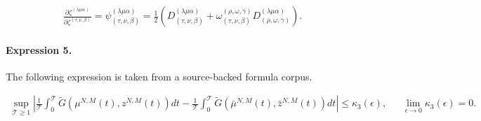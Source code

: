 \documentclass[11pt]{article}
\begin{document}
\begin{align*}\frac{\partial \zeta^{(\lambda\mu\alpha)}}{\partial \zeta^{(\tau,\nu,\beta)}}=\psi^{(\lambda\mu\alpha)}_{(\tau,\nu,\beta)}=\frac{1}{2} \left(D^{(\lambda\mu\alpha)}_{(\tau,\nu,\beta)}+\omega^{(\rho,\omega,\gamma)}_{(\tau,\nu,\beta)}D^{(\lambda\mu\alpha)}_{(\rho,\omega,\gamma)}\right).\end{align*}

\paragraph{Expression 5.} The following expression is taken from a source-backed formula corpus.

\begin{align*}\sup_{\mathcal{T} \geq 1}|\frac{1}{\mathcal{T}}\int_0^{\mathcal{T}} \tilde G(\mu^{N,M}(t),z^{N,M}(t))dt - \frac{1}{\mathcal{T}}\int_0^{\mathcal{T}} \tilde G(\bar \mu^{N,M}(t),\bar z^{N,M}(t))dt|\leq \kappa_3(\epsilon), \ \ \ \ \ \ \ \lim_{\epsilon\rightarrow 0}\kappa_3(\epsilon) =0.\end{align*}
\end{document}
